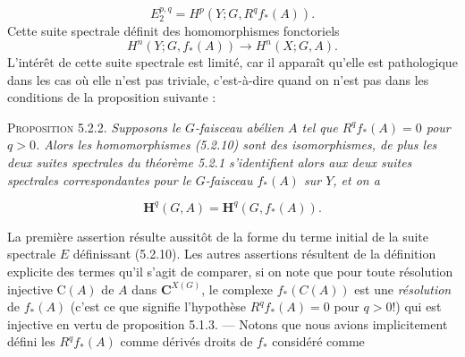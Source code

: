 \[
E_2^{p,q}=H^p(Y;G,R^qf_*(A)).
\]
Cette suite spectrale définit des homomorphismes fonctoriels
\[
H^n(Y;G,f_*(A))\to H^n(X;G,A).
\tag{5.2.10}
\]
L'intérêt de cette suite spectrale est limité, car il apparaît qu'elle est
pathologique dans les cas où elle n'est pas triviale, c'est-à-dire quand on
n'est pas dans les conditions de la proposition suivante :

\textsc{Proposition 5.2.2.} \textit{Supposons le $G$-faisceau
abélien $A$ tel que $R^qf_*(A)=0$ pour $q>0$. Alors les homomorphismes
\textup{(5.2.10)} sont des isomorphismes, de plus les deux suites spectrales du
théorème \textup{5.2.1} s'identifient alors aux deux suites spectrales correspondantes
pour le $G$-faisceau $f_*(A)$ sur $Y$, et on a}

\[
\mathbf H^q(G,A)=\mathbf H^q(G,f_*(A)).
\tag{5.2.11}
\]

La première assertion résulte aussitôt de la forme du terme initial de la
suite spectrale $E$ définissant (5.2.10). Les autres assertions résultent de
la définition explicite des termes qu'il s'agit de comparer, si on note que
pour toute résolution injective $\mathrm C(A)$ de $A$ dans ${\mathbf C}^{X(G)}$, le complexe
$f_*(C(A))$ est une \textit{résolution} de $f_*(A)$ (c'est ce que signifie
l'hypothèse $R^qf_*(A)=0$ pour $q>0$!) qui est injective en vertu de
proposition 5.1.3. --- Notons que nous avions implicitement défini les
$R^qf_*(A)$ comme dérivés droits de $f_*$ considéré comme

